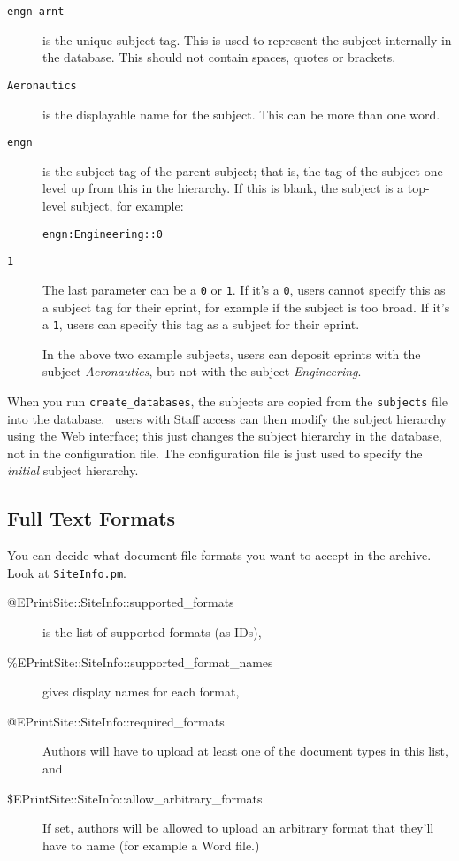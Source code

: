 \begin{description}
\item[{\tt engn-arnt}] is the unique subject tag. This is used to represent the subject internally in the database. This should not contain spaces, quotes or brackets.
\item[{\tt Aeronautics}] is the displayable name for the subject. This can be more than one word.
\item[{\tt engn}] is the subject tag of the parent subject; that is, the tag of the subject one level up from this in the hierarchy. If this is blank, the subject is a top-level subject, for example:

\begin{verbatim}
engn:Engineering::0
\end{verbatim}

\item[{\tt 1}] The last parameter can be a {\tt 0} or {\tt 1}. If it's a {\tt 0}, users cannot specify this as a subject tag for their eprint, for example if the subject is too broad. If it's a {\tt 1}, users can specify this tag as a subject for their eprint.

In the above two example subjects, users can deposit eprints with the subject \emph{Aeronautics}, but not with the subject \emph{Engineering}.
\end{description}

When you run {\tt create\_databases}, the subjects are copied from the {\tt subjects} file into the database. \eprints\ users with Staff access can then modify the subject hierarchy using the Web interface; this just changes the subject hierarchy in the database, not in the configuration file. The configuration file is just used to specify the \emph{initial} subject hierarchy.


\subsection{Full Text Formats}

You can decide what document file formats you want to accept in the archive. Look at {\tt SiteInfo.pm}.

\begin{description}
\item[@EPrintSite::SiteInfo::supported\_formats] is the list of supported formats (as IDs),
\item[\%EPrintSite::SiteInfo::supported\_format\_names] gives display names for each format,
\item[@EPrintSite::SiteInfo::required\_formats] Authors will have to upload at least one of the document types in this list, and
\item[\$EPrintSite::SiteInfo::allow\_arbitrary\_formats] If set, authors will be allowed to upload an arbitrary format that they'll have to name (for example a Word file.)
\end{description}


